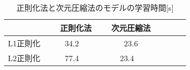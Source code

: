 \begin{table}[t]
\begin{center}
\caption{正則化法と次元圧縮法のモデルの学習時間[s]}
  \begin{tabular}{c|c|cccc|c} \hline
      &　\small 正則化法　&　次元圧縮法 \\ \hline
     \small L1正則化 & 34.2 &　23.6　\\
     \small L2正則化 & 77.4 & 23.4 \\  \hline
      \end{tabular}
      \label{jikkou}
      \end{center}
\end{table}